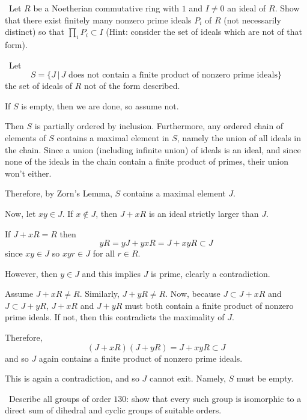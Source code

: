 \documentclass[12pt]{AlgebraQual}
\begin{document}
\begin{problem} $\,$
Let $R$ be a Noetherian commutative ring with $1$ and $I\not=0$ an ideal of $R$. Show that there exist finitely many nonzero prime ideals $P_i$ of $R$ (not necessarily distinct) so that $\prod_iP_i\subset I$ (Hint: consider the set of ideals which are not of that form).
\end{problem}


\begin{solution}$\,$
Let $$S=\{J\,|\, J\text{ does not contain a finite product of nonzero prime ideals}\}$$ the set of ideals of $R$ not of the form described.

If $S$ is empty, then we are done, so assume not.

Then $S$ is partially ordered by inclusion. Furthermore, any ordered chain of elements of $S$ contains a maximal element in $S$, namely the union of all ideals in the chain. Since a union (including infinite union) of ideals is an ideal, and since none of the ideals in the chain contain a finite product of primes, their union won't either.

Therefore, by Zorn's Lemma, $S$ contains a maximal element $J$.

Now, let $xy\in J$. If $x\notin J$, then $J+xR$ is an ideal strictly larger than $J$.

If $J+xR=R$ then $$yR=yJ+yxR=J+xyR\subset J$$ since $xy\in J$ so $xyr\in J$ for all $r\in R$.

However, then $y\in J$ and this implies $J$ is prime, clearly a contradiction.

Assume $J+xR\not=R$. Similarly, $J+yR\not=R$. Now, because $J\subset J+xR$ and $J\subset J+yR$, $J+xR$ and $J+yR$ must both contain a finite product of nonzero prime ideals. If not, then this contradicts the maximality of $J$.

Therefore, $$(J+xR)(J+yR)=J+xyR\subset J$$ and so $J$ again contains a finite product of nonzero prime ideals.

This is again a contradiction, and so $J$ cannot exit. Namely, $S$ must be empty.
\end{solution}
\newpage


\begin{problem} $\,$
Describe all groups of order $130$: show that every such group is isomorphic to a direct sum of dihedral and cyclic groups of suitable orders.
\end{problem}
\end{document}
